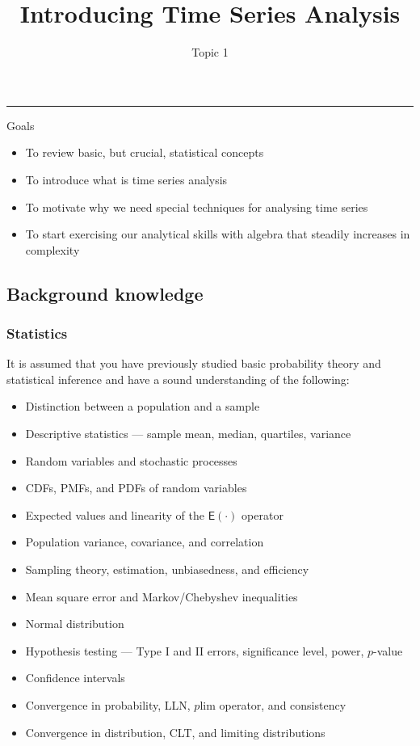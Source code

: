 \documentclass[
  letterpaper,
  DIV=11,
  numbers=noendperiod]{scrartcl}
\title{Introducing Time Series Analysis}
\subtitle{Topic 1}
\author{}
\date{}
\providecommand{\tightlist}{%
  \setlength{\itemsep}{0pt}\setlength{\parskip}{0pt}}
\begin{document}
\maketitle


\begin{center}\rule{0.5\linewidth}{0.5pt}\end{center}

{Goals}

\begin{itemize}
\tightlist
\item
  To review basic, but crucial, statistical concepts
\item
  To introduce what is time series analysis
\item
  To motivate why we need special techniques for analysing time series
\item
  To start exercising our analytical skills with algebra that steadily
  increases in complexity
\end{itemize}

\subsection{Background knowledge}\label{background-knowledge}

\subsubsection{Statistics}\label{statistics}

It is assumed that you have previously studied basic probability theory
and statistical inference and have a sound understanding of the
following:

\begin{itemize}
\tightlist
\item
  Distinction between a population and a sample
\item
  Descriptive statistics --- sample mean, median, quartiles, variance
\item
  Random variables and stochastic processes
\item
  CDFs, PMFs, and PDFs of random variables
\item
  Expected values and linearity of the \(\mathsf{E}(\cdot)\) operator
\item
  Population variance, covariance, and correlation
\item
  Sampling theory, estimation, unbiasedness, and efficiency
\item
  Mean square error and Markov/Chebyshev inequalities
\item
  Normal distribution
\item
  Hypothesis testing --- Type I and II errors, significance level,
  power, \(p\)-value
\item
  Confidence intervals
\item
  Convergence in probability, LLN, \(p\)lim operator, and consistency
\item
  Convergence in distribution, CLT, and limiting distributions
\end{itemize}
\end{document}
